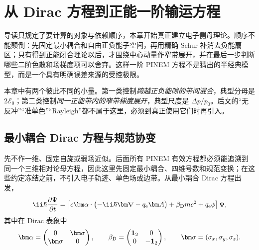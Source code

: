 \chapter{从 Dirac 方程到正能一阶输运方程}
\label{chap:electron-reduction}

导读只规定了要计算的对象与依赖顺序，本章开始真正建立电子侧母理论。顺序不能颠倒：先固定最小耦合和自由正负能子空间，再用精确 Schur 补消去负能扇区；只有得到正能闭合理论以后，才围绕中心动量作窄带展开，并在最后一步判断哪些二阶色散和场梯度项可以舍弃。这样一阶 PINEM 方程不是猜出的半经典模型，而是一个具有明确误差来源的受控极限。

本章中有两个彼此不同的小量。第一类控制\emph{跨越正负能隙的带间混合}，典型分母是 $2\mathcal E_0$；第二类控制\emph{同一正能带内的窄带梯度展开}，典型尺度是 $\Delta p/p_0$。后文的“无反冲”“准单色”“Rayleigh”都不属于这里，必须到真正使用它们时再引入。

\section{最小耦合 Dirac 方程与规范协变}
先不作一维、固定自旋或弱场近似。后面所有 PINEM 有效方程都必须能追溯到同一个三维相对论母方程，因此这里先固定最小耦合、四维号数和规范变换；在这些约定冻结之前，不引入电子轨迹、单色场或边带。从最小耦合 Dirac 方程出发，
\begin{equation}
 \ii\hbar\frac{\partial\Psi}{\partial t}
 =\left[c\bm\alpha\cdot\bigl(-\ii\hbar\bm\nabla-q_{\rm e}\bm A\bigr)
 +\beta_{\rm D}mc^2+q_{\rm e}\phi\right]\Psi,
 \label{eq:dirac-3d}
\end{equation}
其中在 Dirac 表象中
\begin{equation}
 \bm\alpha=
 \begin{pmatrix}
 0&\bm\sigma\\
 \bm\sigma&0
 \end{pmatrix},
 \qquad
 \beta_{\rm D}=
 \begin{pmatrix}
 \mathbf 1_2&0\\
 0&-\mathbf 1_2
 \end{pmatrix},
 \qquad
 \bm\sigma=(\sigma_x,\sigma_y,\sigma_z).
 \label{eq:dirac-matrices}
\end{equation}


